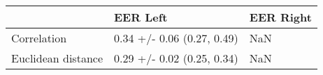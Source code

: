 \begin{tabular}{lll}
\toprule
{} &                    EER Left & EER Right \\
\midrule
Correlation        &  0.34 +/- 0.06 (0.27, 0.49) &       NaN \\
Euclidean distance &  0.29 +/- 0.02 (0.25, 0.34) &       NaN \\
\bottomrule
\end{tabular}
